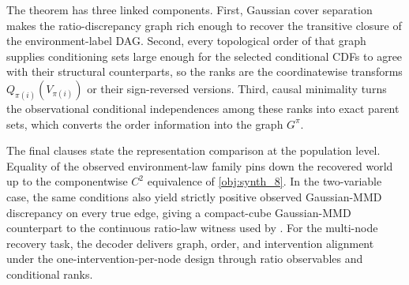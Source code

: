 The theorem has three linked components. First, Gaussian cover separation makes the ratio-discrepancy graph rich enough to recover the transitive closure of the environment-label DAG. Second, every topological order of that graph supplies conditioning sets large enough for the selected conditional CDFs to agree with their structural counterparts, so the ranks are the coordinatewise transforms \(Q_{\pi(i)}(V_{\pi(i)})\) or their sign-reversed versions. Third, causal minimality turns the observational conditional independences among these ranks into exact parent sets, which converts the order information into the graph \(G^\pi\).

The final clauses state the representation comparison at the population level. Equality of the observed environment-law family pins down the recovered world up to the componentwise \(C^2\) equivalence of \cref{obj:synth_8}. In the two-variable case, the same conditions also yield strictly positive observed Gaussian-MMD discrepancy on every true edge, giving a compact-cube Gaussian-MMD counterpart to the continuous ratio-law witness used by \citet{vonKugelgenEtAl2023UnknownInterventions}. For the multi-node recovery task, the decoder delivers graph, order, and intervention alignment under the one-intervention-per-node design through ratio observables and conditional ranks.
